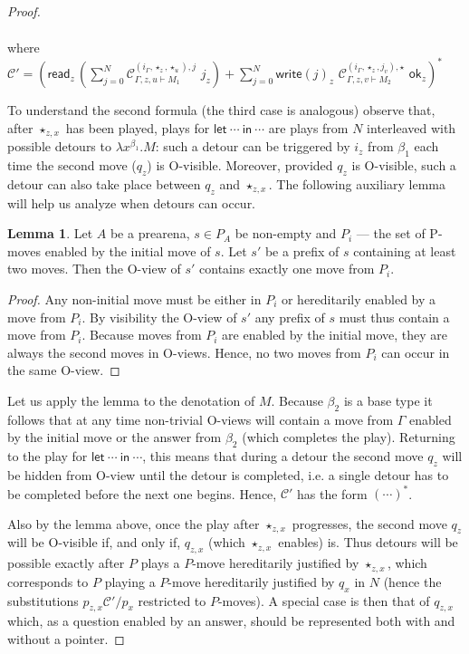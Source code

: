 \documentclass{CSML}
\theoremstyle{definition}\newtheorem{definition}[thm]{Definition}
\theoremstyle{definition}\newtheorem{example}[thm]{Example}
\theoremstyle{definition}\newtheorem{proposition}[thm]{Proposition}
\theoremstyle{definition}\newtheorem{lemma}[thm]{Lemma}
\theoremstyle{definition}\newtheorem{theorem}[thm]{Theorem}
\theoremstyle{definition}\newtheorem{corollary}[thm]{Corollary}
\theoremstyle{definition}\newtheorem{remark}[thm]{Remark}
\newcommand\nt[1]{#1}
\newcommand\clg[1]{\mathcal{#1}}
\newcommand\mwrite[1]{\mathsf{write}(#1)}
\newcommand\mread{\mathsf{read}}
\newcommand\mok{\mathsf{ok}}
\newcommand\compi[2]{\mathcal{C}_{#1}^{#2}}
\newcommand\letin[2]{\mathsf{let}\ #1\ \mathsf{in}\ #2}
\newcommand\seq[2]{{#1} \vdash {#2}}
\begin{document}
\begin{proof}
\begin{itemize}
\[\begin{array}{rcl}
\end{array}\]
where $\clg{C}'=(\mread_z\, (\sum_{j=0}^N\compi{\seq{\Gamma,z,u}{M_1}}{(i_\Gamma,\star_z,\star_u),j} \,\,j_z) 
+ \sum_{j=0}^N\mwrite{j}_z\,\, \compi{\seq{\Gamma,z,v}{M_2}}{(i_\Gamma,\star_z,j_v),\star} \,\, \mok_z
)^\ast$ 
\end{itemize}
To understand the second formula (the third case is analogous) observe that, after $\star_{z,x}$ has been played,
plays for $\letin{\cdots}{\cdots}$ are plays from $N$ interleaved with possible detours to $\lambda x^{\beta_1}.M$:
such a detour can be triggered by  $i_z$ from $\beta_1$ each time the second move ($q_z$) is O-visible. 
Moreover, provided $q_z$ is O-visible,
such a detour can also take place between $q_z$ and $\star_{z,x}$.
The following auxiliary lemma will help us analyze when detours can occur.
\begin{lemma}
Let $A$ be a \nt{prearena}, $ s\in P_A$ be non-empty and  $P_i$ --- the set of P-moves enabled by 
the initial move of $s$. Let $s'$ be a prefix of $s$ containing at least two moves.
Then the O-view of $s'$ contains exactly one move from $P_i$.
\end{lemma}
\begin{proof}
Any non-initial move must be either in $P_i$ or hereditarily enabled by a move from $P_i$.
By visibility the O-view of $s'$ any prefix of $s$ must thus contain
a move from $P_i$. Because moves from $P_i$ are enabled by the initial move, they are
always the second moves in O-views. Hence, no two moves from $P_i$ can occur in the same O-view.
\end{proof}
Let us apply the lemma to the denotation of $M$. Because $\beta_2$ is a base type
it follows that at any time non-trivial O-views will contain a move from $\Gamma$ enabled
by the initial move or the answer from $\beta_2$ (which completes the play).
Returning to the play for $\letin{\cdots}{\cdots}$, this means that during a detour the second move
$q_z$ will be hidden from O-view until the detour is completed, i.e.
a single detour has to be completed
before the next one begins. Hence, $\clg{C'}$ has the form $(\cdots)^\ast$.

Also by the lemma above, once the play after $\star_{z,x}$ progresses, the second move $q_z$ will be O-visible if, and only if,
$q_{z,x}$ (which $\star_{z,x}$ enables) is. Thus detours will be possible exactly after $P$ 
plays a $P$-move hereditarily justified by $\star_{z,x}$, which corresponds to $P$ playing
a $P$-move hereditarily justified by $q_x$ in $N$ (hence the substitutions $p_{z,x} \clg{C'}/ p_x$ restricted
to $P$-moves). A special case is then that of $q_{z,x}$ which, as a question enabled by an answer, should be represented both with and without a pointer.


\end{proof}
\end{document}
